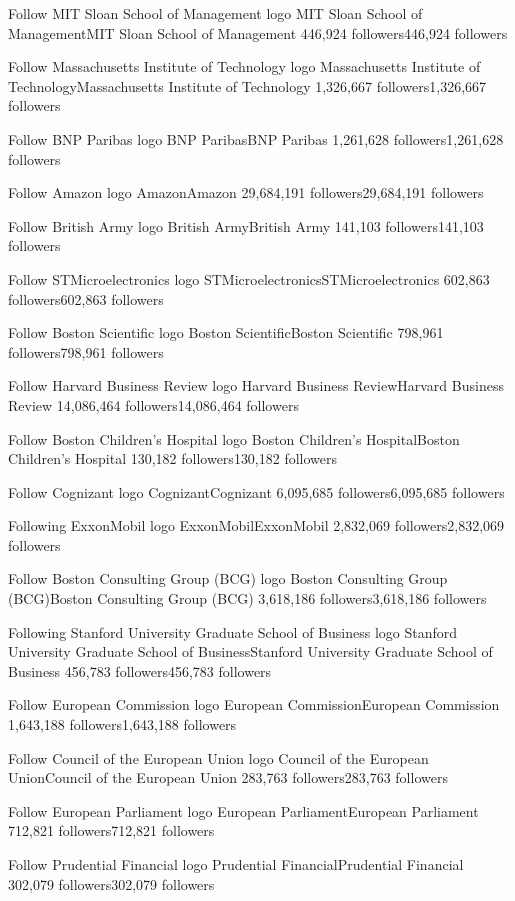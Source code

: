 Follow
MIT Sloan School of Management logo
MIT Sloan School of ManagementMIT Sloan School of Management
446,924 followers446,924 followers

Follow
Massachusetts Institute of Technology logo
Massachusetts Institute of TechnologyMassachusetts Institute of Technology
1,326,667 followers1,326,667 followers

Follow
BNP Paribas logo
BNP ParibasBNP Paribas
1,261,628 followers1,261,628 followers

Follow
Amazon logo
AmazonAmazon
29,684,191 followers29,684,191 followers

Follow
British Army logo
British ArmyBritish Army
141,103 followers141,103 followers

Follow
STMicroelectronics logo
STMicroelectronicsSTMicroelectronics
602,863 followers602,863 followers

Follow
Boston Scientific logo
Boston ScientificBoston Scientific
798,961 followers798,961 followers

Follow
Harvard Business Review logo
Harvard Business ReviewHarvard Business Review
14,086,464 followers14,086,464 followers

Follow
Boston Children's Hospital logo
Boston Children's HospitalBoston Children's Hospital
130,182 followers130,182 followers

Follow
Cognizant logo
CognizantCognizant
6,095,685 followers6,095,685 followers

Following
ExxonMobil logo
ExxonMobilExxonMobil
2,832,069 followers2,832,069 followers

Follow
Boston Consulting Group (BCG) logo
Boston Consulting Group (BCG)Boston Consulting Group (BCG)
3,618,186 followers3,618,186 followers

Following
Stanford University Graduate School of Business logo
Stanford University Graduate School of BusinessStanford University Graduate School of Business
456,783 followers456,783 followers

Follow
European Commission logo
European CommissionEuropean Commission
1,643,188 followers1,643,188 followers

Follow
Council of the European Union logo
Council of the European UnionCouncil of the European Union
283,763 followers283,763 followers

Follow
European Parliament logo
European ParliamentEuropean Parliament
712,821 followers712,821 followers

Follow
Prudential Financial logo
Prudential FinancialPrudential Financial
302,079 followers302,079 followers


